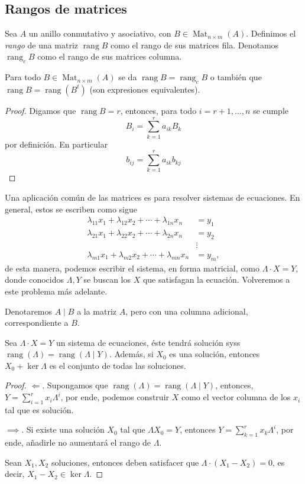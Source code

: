 \documentclass[11pt,oneside]{book}
\DeclareMathOperator{\rang}{rang}
\DeclareMathOperator{\Mat}{Mat}
\begin{document}
\subsection*{Rangos de matrices}
\begin{mydef}
Sea $A$ un anillo conmutativo y asociativo, con $B\in\Mat_{n\times m}(A)$. Definimos el \textit{rango} de una matriz $\rang B$ como el rango de sus matrices fila. Denotamos $\rang_c B$ como el rango de sus matrices columna.
\end{mydef}
\begin{thm}
Para todo $B\in\Mat_{n\times m}(A)$ se da $\rang B=\rang_c B$ o también que $\rang B=\rang(B^t)$ (son expresiones equivalentes).
\end{thm}
\begin{proof}
Digamos que $\rang B=r$, entonces, para todo $i=r+1,\dots,n$ se cumple
$$B_i=\sum_{k=1}^r a_{ik}B_k$$
por definición. En particular
$$b_{ij}=\sum_{k=1}^r a_{ik}b_{kj}$$
\end{proof}
Una aplicación común de las matrices es para resolver sistemas de ecuaciones. En general, estos se escriben como sigue
\begin{align*}
\lambda_{11}x_1+\lambda_{12}x_2+\cdots+\lambda_{1n}x_n&=y_1\\
\lambda_{21}x_1+\lambda_{22}x_2+\cdots+\lambda_{2n}x_n&=y_2\\
&\vdots\\
\lambda_{m1}x_1+\lambda_{m2}x_2+\cdots+\lambda_{mn}x_n&=y_m,
\end{align*}
de esta manera, podemos escribir el sistema, en forma matricial, como $\Lambda\cdot X=Y$, donde conocidos $\Lambda, Y$ se buscan los $X$ que satisfagan la ecuación. Volveremos a este problema más adelante.

Denotaremos $A\mid B$ a la matriz $A$, pero con una columna adicional, correspondiente a $B$.
\begin{thm}
Sea $\Lambda\cdot X=Y$ un sistema de ecuaciones, éste tendrá solución syss $\rang(\Lambda)=\rang(\Lambda\mid Y)$. Además, si $X_0$ es una solución, entonces $X_0+\ker\Lambda$ es el conjunto de todas las soluciones.
\end{thm}
\begin{proof}
$\Longleftarrow$. Supongamos que $\rang(\Lambda)=\rang(\Lambda\mid Y)$, entonces, $Y=\sum_{i=1}^rx_i\Lambda^i$, por ende, podemos construir $X$ como el vector columna de los $x_i$ tal que es solución.

$\implies$. Si existe una solución $X_0$ tal que $\Lambda X_0=Y$, entonces $Y=\sum_{k=1}^r x_k\Lambda^i$, por ende, añadirle no aumentará el rango de $\Lambda$.

Sean $X_1,X_2$ soluciones, entonces deben satisfacer que $\Lambda\cdot(X_1-X_2)=0$, es decir, $X_1-X_2\in\ker\Lambda$.
\end{proof}
\end{document}
